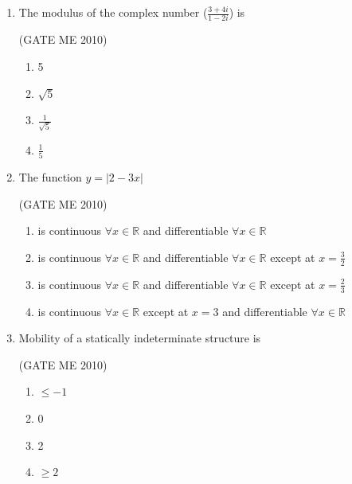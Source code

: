 \documentclass[journal,12pt,onecolumn]{IEEEtran}
\theoremstyle{remark}
\begin{document}
\begin{enumerate}
\begin{multicols}{4}
\begin{enumerate}
    \item $-\pi$
    \item $-\pi/2$
    \item $-\pi/2$
    \item $\pi$
\end{enumerate}
\end{multicols}





\item  The modulus of the complex number ($\frac{3+4i}{1-2i}$) is

 \hfill{(GATE ME 2010)}
 
\begin{multicols}{4}
    \begin{enumerate}

        \item 5
        \item $\sqrt{5}$
        \item $\frac{1}{\sqrt{5}}$
        \item $\frac{1}{5}$
 \end{enumerate}
\end{multicols}


\item The function $y = |2 - 3x|$

 \hfill{(GATE ME 2010)}
 
\begin{enumerate}
\item is continuous $\forall x \in  \mathbb{R}$ and differentiable $\forall x \in \mathbb{R}$
\item is continuous $\forall x \in \mathbb{R}$ and differentiable $\forall x \in \mathbb{R}$ except at $x = \frac{3}{2}$
\item is continuous $\forall x \in \mathbb{R}$ and differentiable $\forall x \in \mathbb{R}$ except at $x = \frac{2}{3}$
\item is continuous $\forall x \in \mathbb{R}$ except at $x = 3$ and differentiable $\forall x \in \mathbb{R}$
\end{enumerate}

 
\item  Mobility of a statically indeterminate structure is 

 \hfill{(GATE ME 2010)}
\begin{multicols}{4}
\begin{enumerate}
\item $\le{-1}$
\item 0
\item 2 
\item $\ge{2}$
\end{enumerate}
\end{multicols}



\end{enumerate}
\end{document}

